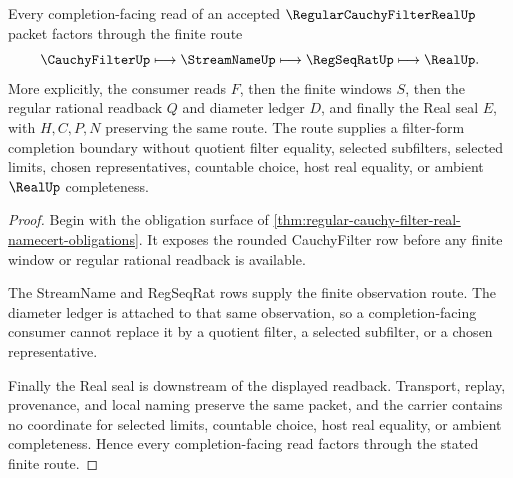 \begin{theorem}
\label{thm:regular-cauchy-filter-real-completion-route}
Every completion-facing read of an accepted $\RegularCauchyFilterRealUp$ packet factors through the finite route
$$
\CauchyFilterUp \longmapsto \StreamNameUp \longmapsto \RegSeqRatUp \longmapsto \RealUp .
$$
More explicitly, the consumer reads $F$, then the finite windows $S$, then the regular rational readback $Q$ and diameter ledger $D$, and finally the Real seal $E$, with $H,C,P,N$ preserving the same route. The route supplies a filter-form completion boundary without quotient filter equality, selected subfilters, selected limits, chosen representatives, countable choice, host real equality, or ambient $\RealUp$ completeness.
\end{theorem}
\begin{proof}
Begin with the obligation surface of \autoref{thm:regular-cauchy-filter-real-namecert-obligations}. It exposes the rounded CauchyFilter row before any finite window or regular rational readback is available.

The StreamName and RegSeqRat rows supply the finite observation route. The diameter ledger is attached to that same observation, so a completion-facing consumer cannot replace it by a quotient filter, a selected subfilter, or a chosen representative.

Finally the Real seal is downstream of the displayed readback. Transport, replay, provenance, and local naming preserve the same packet, and the carrier contains no coordinate for selected limits, countable choice, host real equality, or ambient completeness. Hence every completion-facing read factors through the stated finite route.
\end{proof}



